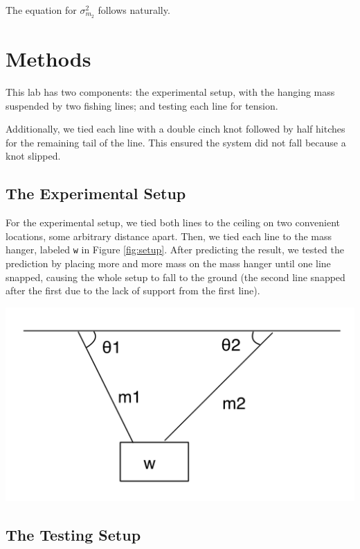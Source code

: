 \documentclass[12pt]{article}
\begin{document}
The equation for \(\sigma_{m_2}^2\) follows naturally.
\section{Methods}
\label{sec:org5aca3eb}

This lab has two components: the experimental setup, with the hanging mass suspended by two fishing lines; and testing each line for tension.

Additionally, we tied each line with a double cinch knot followed by half hitches for the remaining tail of the line. This ensured the system did not fall because a knot slipped.
\subsection{The Experimental Setup}
\label{sec:org79b9add}

For the experimental setup, we tied both lines to the ceiling on two convenient locations, some arbitrary distance apart. Then, we tied each line to the mass hanger, labeled \texttt{w} in Figure \ref{fig:setup}. After predicting the result, we tested the prediction by placing more and more mass on the mass hanger until one line snapped, causing the whole setup to fall to the ground (the second line snapped after the first due to the lack of support from the first line).

\begin{center}
\includegraphics[width=6.5in]{./lab4diagram.png}
\end{center}
\subsection{The Testing Setup}
\label{sec:orgf10808b}
\end{document}
